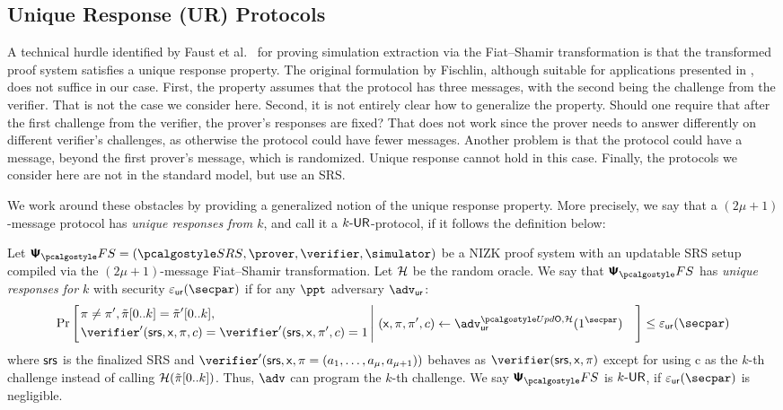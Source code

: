 \subsection{Unique Response (UR) Protocols}
A technical hurdle identified by Faust et al.~\cite{INDOCRYPT:FKMV12} for proving
simulation extraction via the Fiat--Shamir transformation is that the transformed
proof system satisfies a unique response property. The original formulation by Fischlin, although suitable for applications presented in
\cite{C:Fischlin05,INDOCRYPT:FKMV12}, does not suffice in our case. First, the
property assumes that the protocol has three messages, with the second being the
challenge from the verifier. That is not the case we consider here. Second, it is not
entirely clear how to generalize the property. Should one require that after the
first challenge from the verifier, the prover's responses are fixed?  That does not
work since the prover needs to answer differently on different verifier's challenges,
as otherwise the protocol could have fewer messages.  Another problem is that the
protocol could have a message, beyond the first prover's message, which is
randomized. Unique response cannot hold in this case. Finally, the protocols we
consider here are not in the standard model, but use an SRS.

We work around these obstacles by providing a generalized notion of the unique
response property. More precisely, we say that a $(2\mu + 1)$-message protocol
has \emph{unique responses from $k$}, and call it a ${k\text{-}\mathsf{UR}}$-protocol, if it
follows the definition below:

\begin{definition}
Let $\psfs = (\SRScer, \prover, \verifier, \simulator)$ be a NIZK proof system with an updatable SRS setup compiled via the $(2\mu + 1)$-message Fiat--Shamir transformation. Let $\mathcal{H}$ be the random oracle. 
We say that $\psfs$ has \emph{unique responses for $k$} with security $\epsur(\secpar)$ if for any $\ppt$ adversary $\advur$:
  \[
	\Pr\left[
		\left.
	\begin{aligned}
	& \zkproof \neq \zkproof', \tzkproof[0..k] = \tzkproof'[0..k],  \\
	& \verifier' (\srs, \inp, \zkproof,c) =
	\verifier' (\srs, \inp, \zkproof',c) = 1  \\
	\end{aligned}
	\,\right|\,
	\begin{aligned}
		& (\inp, \zkproof, \zkproof', c) \gets \advur^{\initU,\ro}(1^\secpar) 
	\end{aligned}
	\right] \leq \epsur(\secpar) 
	\]
	where $\mathsf{srs}$ is the finalized SRS and $\verifier'(\srs,\inp,\zkproof=(a_1, \dots, a_\mu,a_{\mu+1}))$ behaves as $\verifier (\srs, \inp, \zkproof)$ except for using c as the $k$-th challenge instead of calling $\mathcal{H}(\tilde{\pi}[0..k]) $. Thus, $\adv$ can program the $k$-th challenge. 
	We say $\psfs$  is ${k\text{-}\mathsf{UR}}$, if $\epsur(\secpar)$ is negligible.
\end{definition}

